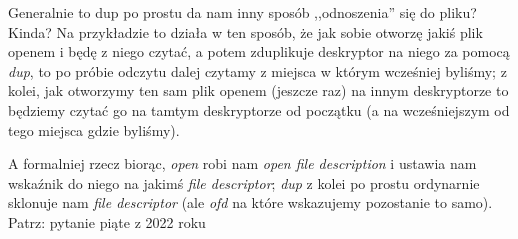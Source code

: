 Generalnie to dup po prostu da nam inny sposób ,,odnoszenia'' się do pliku? Kinda? Na przykładzie to działa w ten sposób, że jak sobie otworzę jakiś plik openem i będę z niego czytać, a potem zduplikuje deskryptor na niego za pomocą \textit{dup}, to po próbie odczytu dalej czytamy z miejsca w którym wcześniej byliśmy; z kolei, jak otworzymy ten sam plik openem (jeszcze raz) na innym deskryptorze to będziemy czytać go na tamtym deskryptorze od początku (a na wcześniejszym od tego miejsca gdzie byliśmy).

A formalniej rzecz biorąc, \textit{open} robi nam \textit{open file description} i ustawia nam wskaźnik do niego na jakimś \textit{file descriptor}; \textit{dup} z kolei po prostu ordynarnie sklonuje nam \textit{file descriptor} (ale \textit{ofd} na które wskazujemy pozostanie to samo). Patrz: pytanie piąte z 2022 roku